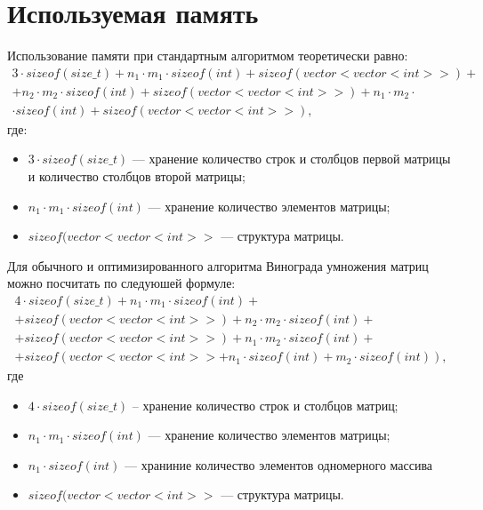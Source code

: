 \clearpage

\section{Используемая память}

Использование памяти при стандартным алгоритмом теоретически равно: 
\begin{equation}
	\label{eq:normal}
	\begin{aligned}
		3 \cdot sizeof(size\_t) + {n_1} \cdot {m_1} \cdot sizeof(int) + sizeof(vector<vector<int>>) + \\
		+{n_2} \cdot {m_2} \cdot sizeof(int) + sizeof(vector<vector<int>>) + {n_1} \cdot {m_2} \cdot \\ 
		\cdot sizeof(int) + sizeof(vector<vector<int>>),
	\end{aligned}
\end{equation}
где:
\begin{itemize}
	\item $3 \cdot sizeof(size\_t) $ --- хранение количество строк и столбцов первой матрицы и количество столбцов второй матрицы;
	\item ${n_1} \cdot {m_1} \cdot sizeof(int) $ --- хранение количество элементов матрицы;
	\item $sizeof(vector<vector<int>>$ --- структура матрицы.
\end{itemize}

Для обычного и оптимизированного алгоритма Винограда умножения матриц можно посчитать по следуюшей формуле:
\begin{equation}
	\label{eq:vinograd}
	\begin{aligned}
		4 \cdot sizeof(size\_t) + {n_1} \cdot {m_1} \cdot sizeof(int) + \\
		+sizeof(vector<vector<int>>) + {n_2} \cdot {m_2} \cdot sizeof(int) + \\
		+ sizeof(vector<vector<int>>) + {n_1} \cdot {m_2} \cdot sizeof(int) + \\
		+sizeof(vector<vector<int>> + {n_1} \cdot sizeof(int) + {m_2} \cdot sizeof(int)),
	\end{aligned}
\end{equation}
где 
\begin{itemize}
	\item $4 \cdot sizeof(size\_t) $ -- хранение количество строк и столбцов матриц;
	\item ${n_1} \cdot {m_1} \cdot sizeof(int) $ --- хранение количество элементов матрицы;
	\item ${n_1} \cdot sizeof(int) $ --- храниние количество элементов одномерного массива
	\item $sizeof(vector<vector<int>>$ --- структура матрицы.
\end{itemize}

